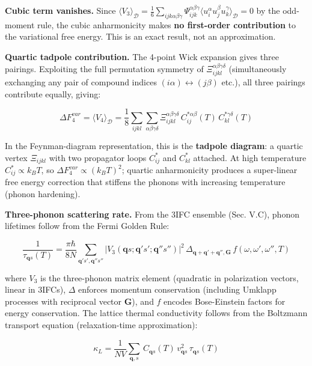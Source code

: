 \documentclass[aps,prb,reprint,amsmath,amssymb,floatfix]{revtex4-2}
\begin{document}
\textbf{Cubic term vanishes.} Since
\(\langle V_3\rangle_\mathcal{D} = \frac{1}{6}\sum_{ijk\alpha\beta\gamma}\Psi_{ijk}^{\alpha\beta\gamma}\langle u_i^\alpha u_j^\beta u_k^\gamma\rangle_\mathcal{D} = 0\)
by the odd-moment rule, the cubic anharmonicity makes \textbf{no
first-order contribution} to the variational free energy. This is an
exact result, not an approximation.

\textbf{Quartic tadpole contribution.} The 4-point Wick expansion gives
three pairings. Exploiting the full permutation symmetry of
\(\Xi_{ijkl}^{\alpha\beta\gamma\delta}\) (simultaneously exchanging any
pair of compound indices \((i\alpha)\leftrightarrow(j\beta)\) etc.), all
three pairings contribute equally, giving:


\begin{equation*}
\boxed{\Delta F_4^{var} = \langle V_4\rangle_\mathcal{D} = \frac{1}{8}\sum_{ijkl}\sum_{\alpha\beta\gamma\delta}\Xi_{ijkl}^{\alpha\beta\gamma\delta}\,C_{ij}^{*\alpha\beta}(T)\,C_{kl}^{*\gamma\delta}(T)}
\end{equation*}

In the Feynman-diagram representation, this is the \textbf{tadpole
diagram}: a quartic vertex \(\Xi_{ijkl}\) with two propagator loops
\(C_{ij}^*\) and \(C_{kl}^*\) attached. At high temperature
\(C_{ij}^*\propto k_BT\), so \(\Delta F_4^{var}\propto(k_BT)^2\);
quartic anharmonicity produces a super-linear free energy correction
that stiffens the phonons with increasing temperature (phonon
hardening).

\textbf{Three-phonon scattering rate.} From the 3IFC ensemble (Sec.
V.C), phonon lifetimes follow from the Fermi Golden Rule:

{\scriptsize
\begin{equation*}
\frac{1}{\tau_{\mathbf{q}s}(T)} = \frac{\pi\hbar}{8N}\sum_{\mathbf{q}'s',\mathbf{q}''s''}\bigl|V_3(\mathbf{q}s;\mathbf{q}'s';\mathbf{q}''s'')\bigr|^2\,\Delta_{\mathbf{q}+\mathbf{q}'+\mathbf{q}'',\mathbf{G}}\,f(\omega,\omega',\omega'',T)
\end{equation*}
}

where \(V_3\) is the three-phonon matrix element (quadratic in
polarization vectors, linear in 3IFCs), \(\Delta\) enforces momentum
conservation (including Umklapp processes with reciprocal vector
\(\mathbf{G}\)), and \(f\) encodes Bose-Einstein factors for energy
conservation. The lattice thermal conductivity follows from the
Boltzmann transport equation (relaxation-time approximation):

\begin{equation*}
\kappa_L = \frac{1}{NV}\sum_{\mathbf{q},s}\,C_{\mathbf{q}s}(T)\,v_{\mathbf{q}s}^2\,\tau_{\mathbf{q}s}(T)
\end{equation*}
\end{document}
